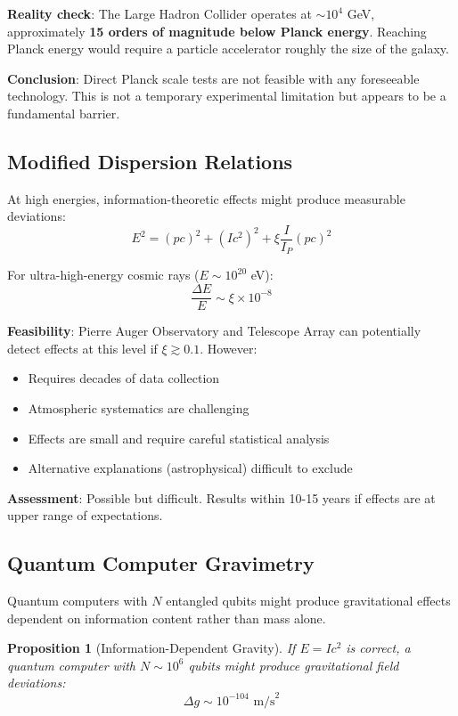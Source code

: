 \documentclass[12pt,twocolumn]{article}
\newtheorem{proposition}[theorem]{Proposition}
\theoremstyle{definition}
\theoremstyle{remark}
\begin{document}
\textbf{Reality check}: The Large Hadron Collider operates at $\sim 10^4$ GeV, approximately \textbf{15 orders of magnitude below Planck energy}. Reaching Planck energy would require a particle accelerator roughly the size of the galaxy.

\textbf{Conclusion}: Direct Planck scale tests are not feasible with any foreseeable technology. This is not a temporary experimental limitation but appears to be a fundamental barrier.

\subsection{Modified Dispersion Relations}

At high energies, information-theoretic effects might produce measurable deviations:
\begin{equation}
E^2 = (pc)^2 + (Ic^2)^2 + \xi \frac{I}{I_P}(pc)^2
\end{equation}

For ultra-high-energy cosmic rays ($E \sim 10^{20}$ eV):
\begin{equation}
\frac{\Delta E}{E} \sim \xi \times 10^{-8}
\end{equation}

\textbf{Feasibility}: Pierre Auger Observatory and Telescope Array can potentially detect effects at this level if $\xi \gtrsim 0.1$. However:
\begin{itemize}
\item Requires decades of data collection
\item Atmospheric systematics are challenging
\item Effects are small and require careful statistical analysis
\item Alternative explanations (astrophysical) difficult to exclude
\end{itemize}

\textbf{Assessment}: Possible but difficult. Results within 10-15 years if effects are at upper range of expectations.

\subsection{Quantum Computer Gravimetry}

Quantum computers with $N$ entangled qubits might produce gravitational effects dependent on information content rather than mass alone.

\begin{proposition}[Information-Dependent Gravity]
If $E = Ic^2$ is correct, a quantum computer with $N \sim 10^6$ qubits might produce gravitational field deviations:
\begin{equation}
\Delta g \sim 10^{-104} \text{ m/s}^2
\end{equation}
\end{proposition}
\end{document}
